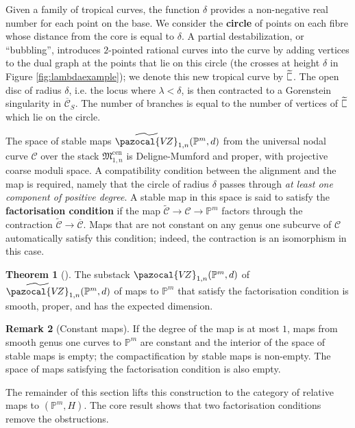 \documentclass[11pt]{amsart}
\newcommand{\plC}{\scalebox{0.8}[1.3]{$\sqsubset$}}
\newcommand{\sqC}{\scalebox{0.8}[1.3]{$\sqsubset$}}
\newcommand{\PP}{\mathbb P}
\newcommand{\VZ}{\pazocal{V\!Z}}
\renewcommand{\to}{\rightarrow}
\theoremstyle{definition}
\newtheorem{thm}{Theorem}[section]
\theoremstyle{definition}
\newtheorem{remark}[thm]{Remark}
\begin{document}
Given a family of tropical curves, the function $\delta$ provides a non-negative real number for each point on the base. We consider the \textbf{circle} of points on each fibre whose distance from the core is equal to $\delta$. A partial destabilization, or ``bubbling'', introduces $2$-pointed rational curves into the curve by adding vertices to the dual graph at the points that lie on this circle (the crosses at height $\delta$ in Figure \ref{fig:lambdaexample}); we denote this new tropical curve by $\widetilde{\plC}$. The open disc of radius $\delta$, i.e. the locus where $\lambda<\delta$, is then contracted to a Gorenstein singularity in $\overline{\mathcal C}_S$. The number of branches is equal to the number of vertices of $\widetilde{\sqC}$ which lie on the circle. %

The space of stable maps $\widetilde\VZ_{1,n}(\PP^m,d)$ from the universal nodal curve $\mathcal C$ over the stack $\mathfrak M_{1,n}^{\mathrm{cen}}$ is Deligne-Mumford and proper, with projective coarse moduli space. A compatibility condition between the alignment and the map is required, namely that the circle of radius $\delta$ passes through \emph{at least one component of positive degree}. A stable map in this space is said to satisfy the \textbf{factorisation condition} if the map $\widetilde{\mathcal C}\to \mathcal C\to \mathbb P^m$ factors through the contraction $\widetilde{\mathcal C}\to \overline{\mathcal C}$. Maps that are not constant on any genus one subcurve of $\mathcal C$ automatically satisfy this condition; indeed, the contraction is an isomorphism in this case.
 
\begin{thm}[{\cite[Theorem B]{RSPW}}]
The substack $\VZ_{1,n}(\mathbb P^m,d)$ of $\widetilde\VZ_{1,n}(\PP^m,d)$ of maps to $\mathbb P^m$ that satisfy the factorisation condition is smooth, proper, and has the expected dimension.
\end{thm}

\begin{remark}[Constant maps]\label{rem: constant-maps}
If the degree of the map is at most $1$, maps from smooth genus one curves to $\PP^m$ are constant and the interior of the space of stable maps is empty; the compactification by stable maps is non-empty. The space of maps satisfying the factorisation condition is also empty. %
\end{remark}

The remainder of this section lifts this construction to the category of relative maps to $(\mathbb P^m,H)$. The core result shows that two factorisation conditions remove the obstructions. 
\end{document}
